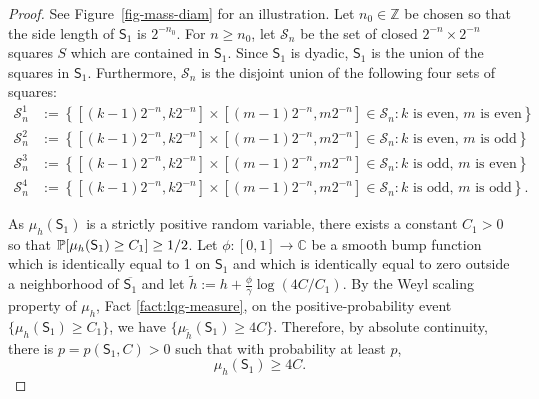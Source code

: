 \documentclass[12pt]{amsart}
\numberwithin{equation}{section}
\begin{document}
	\begin{proof}
		See Figure~\ref{fig-mass-diam} for an illustration. 
		Let $n_0 \in \mathbb Z$ be chosen so that the side length of $\mathsf S_1$ is $2^{-n_0}$. 
		For $n \geq n_0$, let $\mathcal  S_n$ be the set of closed $2^{-n  } \times 2^{-n }$ squares $S$ which are contained in $\mathsf S_1$. 
		Since $\mathsf S_1$ is dyadic, $\mathsf S_1$ is the union of the squares in $\mathsf S_1$. 
		Furthermore, $\mathcal  S_n$ is the disjoint union of the following four sets of squares:
		\begin{align*}
		\mathcal  S_n^1 &:= \left\{[(k-1) 2^{-n} ,k 2^{-n}] \times [(m-1) 2^{-n} , m 2^{-n}] \in \mathcal  S_n : \text{$k$ is even, $m$ is even} \right\} \\
		\mathcal  S_n^2 &:= \left\{[(k-1) 2^{-n} ,k 2^{-n}] \times [(m-1) 2^{-n} , m 2^{-n}] \in \mathcal  S_n : \text{$k$ is even, $m$ is odd} \right\} \\
		\mathcal  S_n^3 &:= \left\{[(k-1) 2^{-n} ,k 2^{-n}] \times [(m-1) 2^{-n} , m 2^{-n}] \in \mathcal  S_n : \text{$k$ is odd, $m$ is even} \right\} \\
		\mathcal  S_n^4 &:= \left\{[(k-1) 2^{-n} ,k 2^{-n}] \times [(m-1) 2^{-n} , m 2^{-n}] \in \mathcal  S_n : \text{$k$ is odd, $m$ is odd} \right\} . 
		\end{align*}
		
		As $\mu_h(\mathsf S_1)$ is a strictly positive random variable, there exists a constant $C_1 > 0$ so that $\P[\mu_h(\mathsf S_1) \geq C_1] \geq 1/2$. 
		Let $\phi : [0,1] \to \mathbb C$ be a smooth bump function which is identically equal to 1 on $\mathsf S_1$ and which is identically equal to zero outside 
		a neighborhood of $\overline{\mathsf S_1}$ and let $\tilde h := h + \frac{\phi}{\gamma} \log(4 C/C_1)$. By the Weyl scaling property of $\mu_h$, Fact \ref{fact:lqg-measure}, on the positive-probability event $\{\mu_h(\mathsf S_1) \geq C_1\}$, we have
		$\{\mu_{\tilde h}(\mathsf S_1) \geq 4 C\}$. Therefore, by absolute continuity, there is $p= p(\mathsf S_1, C) > 0$ such that with probability at least $p$,
		\begin{equation} \label{eqn-square-mass-lower}
		\mu_h(\mathsf S_1) \geq 4C .
		\end{equation}
		

\end{proof}
\end{document}
